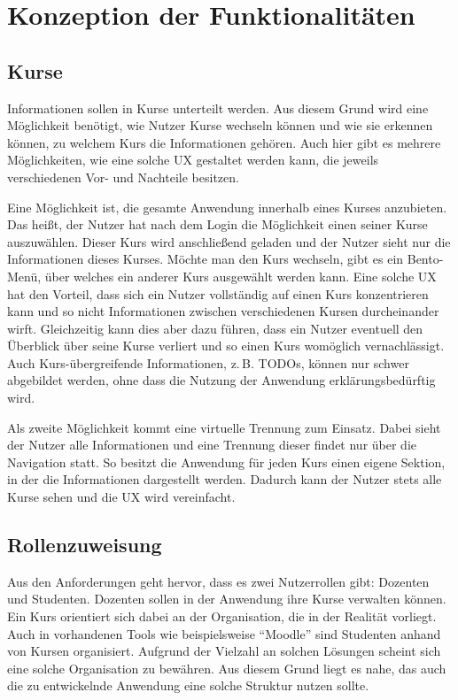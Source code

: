 \section{Konzeption der Funktionalitäten}\label{sec:konzeptionFunktionalitaeten}


\subsection{Kurse}\label{sub:konzeptionKurse}

Informationen sollen in Kurse unterteilt werden.
Aus diesem Grund wird eine Möglichkeit benötigt, wie Nutzer Kurse wechseln können und wie sie erkennen können, zu welchem Kurs die Informationen gehören.
Auch hier gibt es mehrere Möglichkeiten, wie eine solche \ac{UX} gestaltet werden kann, die jeweils verschiedenen Vor- und Nachteile besitzen.

Eine Möglichkeit ist, die gesamte Anwendung innerhalb eines Kurses anzubieten.
Das heißt, der Nutzer hat nach dem Login die Möglichkeit einen seiner Kurse auszuwählen.
Dieser Kurs wird anschließend geladen und der Nutzer sieht nur die Informationen dieses Kurses.
Möchte man den Kurs wechseln, gibt es ein Bento-Menü, über welches ein anderer Kurs ausgewählt werden kann.
Eine solche \ac{UX} hat den Vorteil, dass sich ein Nutzer vollständig auf einen Kurs konzentrieren kann und so nicht Informationen zwischen verschiedenen Kursen durcheinander wirft.
Gleichzeitig kann dies aber dazu führen, dass ein Nutzer eventuell den Überblick über seine Kurse verliert und so einen Kurs womöglich vernachlässigt.
Auch Kurs-übergreifende Informationen, z.\,B. TODOs, können nur schwer abgebildet werden, ohne dass die Nutzung der Anwendung erklärungsbedürftig wird.

Als zweite Möglichkeit kommt eine virtuelle Trennung zum Einsatz.
Dabei sieht der Nutzer alle Informationen und eine Trennung dieser findet nur über die Navigation statt.
So besitzt die Anwendung für jeden Kurs einen eigene Sektion, in der die Informationen dargestellt werden.
Dadurch kann der Nutzer stets alle Kurse sehen und die \ac{UX} wird vereinfacht.



\subsection{Rollenzuweisung}

Aus den Anforderungen geht hervor, dass es zwei Nutzerrollen gibt: Dozenten und Studenten.
Dozenten sollen in der Anwendung ihre Kurse verwalten können.
Ein Kurs orientiert sich dabei an der Organisation, die in der Realität vorliegt.
Auch in vorhandenen Tools wie beispielsweise \enquote{Moodle} sind Studenten anhand von Kursen organisiert.
Aufgrund der Vielzahl an solchen Lösungen scheint sich eine solche Organisation zu bewähren.
Aus diesem Grund liegt es nahe, das auch die zu entwickelnde Anwendung eine solche Struktur nutzen sollte.

